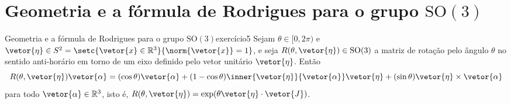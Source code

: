 \section[Geometria e a fórmula de Rodrigues para o grupo SO(3)]{Geometria e a fórmula de Rodrigues para o grupo \(\mathrm{SO}(3)\)}
\begin{proposition}{Geometria e a fórmula de Rodrigues para o grupo \(\mathrm{SO}(3)\)}{exercício5}
    Sejam \(\theta\in [0,2\pi)\) e \(\vetor{\eta} \in S^2 = \setc{\vetor{x}\in \mathbb{R}^3}{\norm{\vetor{x}}= 1}\), e seja \(R(\theta, \vetor{\eta}) \in \mathrm{SO}(3)\) a matriz de rotação pelo ângulo \(\theta\) no sentido anti-horário em torno de um eixo definido pelo vetor unitário \(\vetor{\eta}\). Então
    \begin{equation*}
        R(\theta, \vetor{\eta})\vetor{\alpha} = (\cos\theta)\vetor{\alpha} + (1 - \cos\theta)\inner{\vetor{\eta}}{\vetor{\alpha}}\vetor{\eta} + (\sin\theta)\vetor{\eta}\times\vetor{\alpha}
    \end{equation*}
    para todo \(\vetor{\alpha} \in \mathbb{R}^3\), isto é, \(R(\theta, \vetor{\eta}) = \exp(\theta\vetor{\eta}\cdot\vetor{J})\).
\end{proposition}
